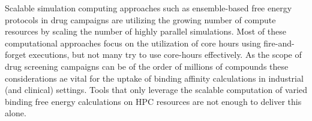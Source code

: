 
Scalable simulation computing approaches such as ensemble-based free energy 
protocols in drug campaigns are utilizing the growing number of compute 
resources by scaling the number of highly parallel simulations. 
Most of these computational approaches focus on the utilization of core hours 
using fire-and-forget executions, but not many try to use core-hours effectively. 
As the scope of drug screening campaigns can be of the order of millions of compounds 
these considerations ae vital for the uptake of binding affinity calculations in 
industrial (and clinical) settings.
Tools that only leverage the scalable computation of varied binding free energy 
calculations on HPC resources are not enough to deliver this alone.




